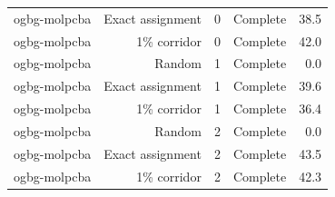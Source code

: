 \begin{longtable}{lrrrr}
ogbg-molpcba & Exact assignment & 0 & Complete & 38.5\\
ogbg-molpcba & 1\% corridor & 0 & Complete & 42.0\\
ogbg-molpcba & Random & 1 & Complete & 0.0\\
ogbg-molpcba & Exact assignment & 1 & Complete & 39.6\\
ogbg-molpcba & 1\% corridor & 1 & Complete & 36.4\\
ogbg-molpcba & Random & 2 & Complete & 0.0\\
ogbg-molpcba & Exact assignment & 2 & Complete & 43.5\\
ogbg-molpcba & 1\% corridor & 2 & Complete & 42.3\\
\end{longtable}
